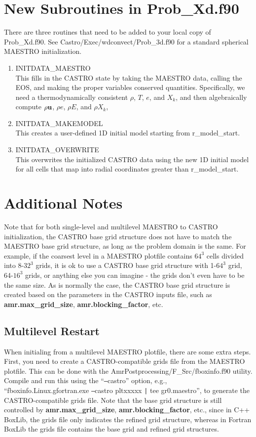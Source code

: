 \section{New Subroutines in Prob\_Xd.f90}
There are three routines that need to be added to your local copy of Prob\_Xd.f90.  See Castro/Exec/wdconvect/Prob\_3d.f90 for a standard spherical MAESTRO initialization.
\begin{enumerate}
\item INITDATA\_MAESTRO\\
This fills in the CASTRO state by taking the MAESTRO data, calling the EOS, and making the proper variables conserved quantities.  Specifically, we need a thermodynamically consistent $\rho$, $T$, $e$, and $X_k$, and then algebraically compute $\rho{\bf u}$, $\rho e$, $\rho E$, and $\rho X_k$,
\item INITDATA\_MAKEMODEL\\
This creates a user-defined 1D initial model starting from r\_model\_start.
\item INITDATA\_OVERWRITE\\
This overwrites the initialized CASTRO data using the new 1D initial model for all cells that map into radial coordinates greater than r\_model\_start.
\end{enumerate}

\section{Additional Notes}
Note that for both single-level and multilevel MAESTRO to CASTRO initialization, the CASTRO base grid structure does not have to match the MAESTRO base grid structure, as long as the problem domain is the same.  For example, if the coarsest level in a MAESTRO plotfile contains $64^3$ cells divided into 8-$32^3$ grids, it is ok to use a CASTRO base grid structure with 1-$64^3$ grid, 64-$16^3$ grids, or anything else you can imagine - the grids don't even have to be the same size.  As is normally the case, the CASTRO base grid structure is created based on the parameters in the CASTRO inputs file, such as {\bf amr.max\_grid\_size}, {\bf amr.blocking\_factor}, etc.

\subsection{Multilevel Restart}
When initialing from a multilevel MAESTRO plotfile, there are some extra steps.  First, you need to create a CASTRO-compatible grids file from the MAESTRO plotfile.  This can be done with the AmrPostprocessing/F\_Src/fboxinfo.f90 utility.  
Compile and run this using the ``\texttt{--}castro'' option, e.g., 
``fboxinfo.Linux.gfortran.exe \texttt{--}castro pltxxxxx \texttt{|} tee gr0.maestro'', 
to generate the CASTRO-compatible grids file.  Note that the base grid structure is still controlled 
by {\bf amr.max\_grid\_size}, {\bf amr.blocking\_factor}, etc., 
since in C++ BoxLib, the grids file only indicates the refined grid structure, 
whereas in Fortran BoxLib the grids file contains the base grid and refined grid structures.

